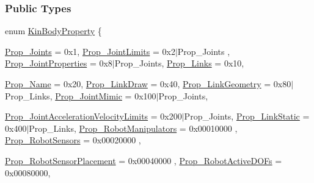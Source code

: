 \subsubsection*{Public Types}
\begin{DoxyCompactItemize}
\item 
enum \hyperlink{classOpenRAVE_1_1KinBody_a973dd96959f97246c92245c42bce238f}{KinBodyProperty} \{ \par
\hyperlink{classOpenRAVE_1_1KinBody_a973dd96959f97246c92245c42bce238fa785fd1ee72bf56f00622d147f18ba985}{Prop\_\-Joints} = 0x1, 
\hyperlink{classOpenRAVE_1_1KinBody_a973dd96959f97246c92245c42bce238fa4814d65685cdcf1a1acd4b0c8379e9a0}{Prop\_\-JointLimits} = 0x2$|$Prop\_\-Joints
, \hyperlink{classOpenRAVE_1_1KinBody_a973dd96959f97246c92245c42bce238fac45ebedd04034c45de4da8c2786fad9e}{Prop\_\-JointProperties} = 0x8$|$Prop\_\-Joints, 
\hyperlink{classOpenRAVE_1_1KinBody_a973dd96959f97246c92245c42bce238fa98f236c1d5da89a2ed36445af493324e}{Prop\_\-Links} = 0x10, 
\par
\hyperlink{classOpenRAVE_1_1KinBody_a973dd96959f97246c92245c42bce238fa47f8210384e3bcc38a5c2c8d3f295c46}{Prop\_\-Name} = 0x20, 
\hyperlink{classOpenRAVE_1_1KinBody_a973dd96959f97246c92245c42bce238fabe5d066e02460667e0f9b81dfe55dca3}{Prop\_\-LinkDraw} = 0x40, 
\hyperlink{classOpenRAVE_1_1KinBody_a973dd96959f97246c92245c42bce238fa980bc1b487ae69ae27b35d1efe3ec671}{Prop\_\-LinkGeometry} = 0x80$|$Prop\_\-Links, 
\hyperlink{classOpenRAVE_1_1KinBody_a973dd96959f97246c92245c42bce238fa9e6648eaadfe2e4b55dae772f95b461b}{Prop\_\-JointMimic} = 0x100$|$Prop\_\-Joints, 
\par
\hyperlink{classOpenRAVE_1_1KinBody_a973dd96959f97246c92245c42bce238fa843c5aa5238d6b2bd4d437a579c3124f}{Prop\_\-JointAccelerationVelocityLimits} = 0x200$|$Prop\_\-Joints, 
\hyperlink{classOpenRAVE_1_1KinBody_a973dd96959f97246c92245c42bce238fa457e7598a9b59f4b89fd8c85ecc8b912}{Prop\_\-LinkStatic} = 0x400$|$Prop\_\-Links, 
\hyperlink{classOpenRAVE_1_1KinBody_a973dd96959f97246c92245c42bce238fad651ee47d87fae146c4cefa49b908c18}{Prop\_\-RobotManipulators} =  0x00010000
, \hyperlink{classOpenRAVE_1_1KinBody_a973dd96959f97246c92245c42bce238faac5baec80229e6eeae7c7ef46d6579a7}{Prop\_\-RobotSensors} =  0x00020000
, \par
\hyperlink{classOpenRAVE_1_1KinBody_a973dd96959f97246c92245c42bce238fa666cc0b7129b93c1a57d55d91681e0f6}{Prop\_\-RobotSensorPlacement} =  0x00040000
, \hyperlink{classOpenRAVE_1_1KinBody_a973dd96959f97246c92245c42bce238fa0952514ee1fd4ebb86990df968573e7a}{Prop\_\-RobotActiveDOFs} =  0x00080000, 

\end{DoxyCompactItemize}
